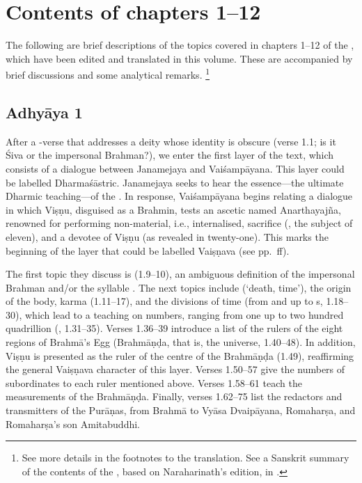 \section{Contents of chapters 1--12}\label{contentsof1_12}

The following are brief descriptions of the topics covered in chapters 
1--12 of the \VSS, which have been edited and translated in this volume. 
These are accompanied by brief discussions and some analytical remarks.%
		\footnote{See more details in the footnotes to the translation.
                          See a Sanskrit summary of the contents of the \VSS, based on Naraharinath's edition,
                          in . }

					
\subsection*{Adhyāya 1}\label{contents_of_ch01}
After a -verse that addresses a 
deity whose identity is obscure\linebreak
(verse 1.1; is it Śiva or the 
impersonal Brahman?), we enter the first layer 
of the text, which consists of a dialogue between Janamejaya and 
Vaiśampāyana. This layer could be labelled Dharmaśāstric.
Janamejaya seeks to hear the essence---the ultimate Dharmic 
teaching---of the \MBh. In response, Vaiśampāyana begins relating 
a dialogue in which Viṣṇu, disguised as a Brahmin, 
tests an ascetic named Anarthayajña, renowned for performing 
non-material, i.e., internalised, sacrifice (, 
the subject of  eleven), and 
a devotee of Viṣṇu (as revealed in  twenty-one). 
This marks the beginning of the layer that could be labelled Vaiṣṇava (see pp.~\pageref{structure}ff). 

The first topic they discuss is  (1.9--10), an
ambiguous definition of the impersonal Brahman and/or the syllable . 
The next topics include  (`death, time'), the origin of the body, karma (1.11--17), 
and the divisions of time (from  and  up to s, 1.18--30), 
which lead to a teaching on numbers, ranging from one up to 
two hundred quadrillion (, 1.31--35).
Verses 1.36--39 introduce a list of the rulers of the eight 
regions of Brahmā's Egg (Brahmāṇḍa, that is, the universe, 1.40--48). 
In addition, Viṣṇu is presented as the ruler of the centre of the Brahmāṇḍa (1.49),  
reaffirming the general Vaiṣṇava character of this layer. 
Verses 1.50--57 give the numbers of subordinates to each ruler mentioned above. 
Verses 1.58--61 teach the measurements of the Brahmāṇḍa. 
Finally, verses 1.62--75 list the redactors and transmitters of the Purāṇas, 
from Brahmā to Vyāsa Dvaipāyana, Romaharṣa, and Romaharṣa's son Amitabuddhi.


